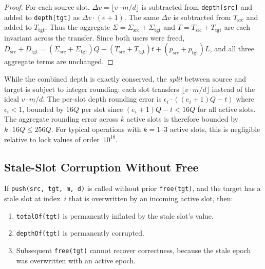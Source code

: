 \documentclass[10pt,a4paper,twocolumn]{article}
\begin{document}
\begin{proof}
For each source slot, $\Delta v = \lfloor v \cdot m/d \rfloor$ is subtracted from \texttt{depth[src]} and added to \texttt{depth[tgt]} as $\Delta v \cdot (e{+}1)$. The same $\Delta v$ is subtracted from $T_{\text{src}}$ and added to $T_{\text{tgt}}$. Thus the aggregate $\Sigma = \Sigma_{\text{src}} + \Sigma_{\text{tgt}}$ and $T = T_{\text{src}} + T_{\text{tgt}}$ are each invariant across the transfer. Since both users were freed, $D_{\text{src}} + D_{\text{tgt}} = (\Sigma_{\text{src}} + \Sigma_{\text{tgt}})Q - (T_{\text{src}} + T_{\text{tgt}})t + (p_{\text{src}} + p_{\text{tgt}})L$, and all three aggregate terms are unchanged.
\end{proof}

\begin{remark}
While the combined depth is exactly conserved, the \emph{split} between source and target is subject to integer rounding: each slot transfers $\lfloor v \cdot m/d \rfloor$ instead of the ideal $v \cdot m/d$. The per-slot depth rounding error is $\epsilon_i \cdot ((e_i{+}1)Q - t)$ where $\epsilon_i < 1$, bounded by $16Q$ per slot since $(e_i{+}1)Q - t < 16Q$ for all active slots. The aggregate rounding error across $k$ active slots is therefore bounded by $k \cdot 16Q \leq 256Q$. For typical operations with $k = 1$--$3$ active slots, this is negligible relative to lock values of order~$10^{18}$.
\end{remark}

\subsection{Stale-Slot Corruption Without Free}

\begin{theorem}
\label{thm:push-corruption}
If \texttt{push(src, tgt, m, d)} is called without prior \texttt{free(tgt)}, and the target has a stale slot at index~$i$ that is overwritten by an incoming active slot, then:
\begin{enumerate}[nosep]
\item \texttt{totalOf(tgt)} is permanently inflated by the stale slot's value.
\item \texttt{depthOf(tgt)} is permanently corrupted.
\item Subsequent \texttt{free(tgt)} cannot recover correctness, because the stale epoch was overwritten with an active epoch.
\end{enumerate}
\end{theorem}
\end{document}
